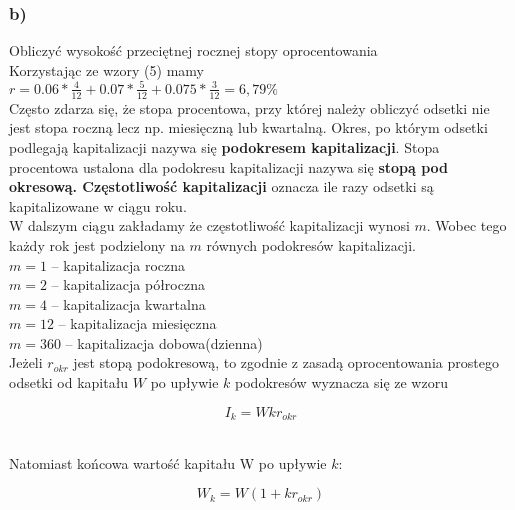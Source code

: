 \documentclass{article}
\begin{document}
\subsubsection{b)}
Obliczyć wysokość przeciętnej rocznej stopy oprocentowania\\
Korzystając ze wzory (5) mamy\\
$ r =  0.06*\frac{4}{12} + 0.07*\frac{5}{12} + 0.075*\frac{3}{12} = 6,79\% $\\

Często zdarza się, że stopa procentowa, przy której należy obliczyć odsetki nie jest stopa roczną lecz np. miesięczną lub kwartalną. Okres, po którym odsetki podlegają kapitalizacji nazywa się \textbf{podokresem kapitalizacji}. Stopa procentowa ustalona dla podokresu kapitalizacji nazywa się \textbf{stopą pod okresową. Częstotliwość kapitalizacji} oznacza ile razy odsetki są kapitalizowane w ciągu roku.\\

W dalszym ciągu zakładamy że częstotliwość kapitalizacji wynosi $ m $. Wobec tego każdy rok jest podzielony na $ m $ równych podokresów kapitalizacji.\\

$ m=1 $ – kapitalizacja roczna\\

$ m=2 $ – kapitalizacja półroczna\\

$ m=4 $ – kapitalizacja kwartalna\\

$ m=12 $ – kapitalizacja miesięczna\\

$ m=360 $ – kapitalizacja dobowa(dzienna)\\

Jeżeli $ r_{okr} $ jest stopą podokresową, to zgodnie z zasadą oprocentowania prostego odsetki od kapitału $ W $ po upływie $ k $ podokresów wyznacza się ze wzoru

\begin{center}
	\begin{equation}
		I_k = Wkr_{okr}
	\end{equation}
\end{center}\\

Natomiast końcowa wartość kapitału W po upływie $ k $:\\

\begin{center}
	\begin{equation}
		W_k = W(1 + kr_{okr})
	\end{equation}
\end{center}\\
\end{document}

